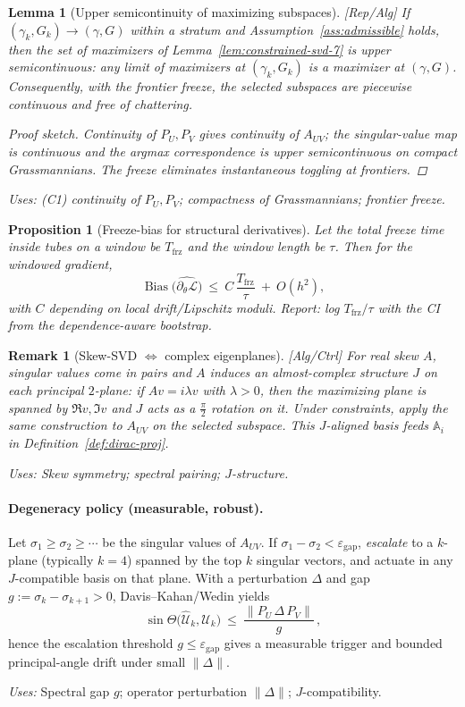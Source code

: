 \documentclass[10pt]{article}
\newcommand{\uses}[1]{\par\smallskip\noindent\textit{Uses: }#1\par\smallskip}
\newenvironment{proofsketch}{\begin{proof}[Proof sketch]}{\end{proof}}
\newtheorem{lemma}{Lemma}
\newtheorem{proposition}{Proposition}
\newtheorem{remark}{Remark}
\begin{document}
\begin{lemma}[Upper semicontinuity of maximizing subspaces]\label{lem:usc-planes}
\emph{[\textup{Rep/Alg}]}
If $(\gamma_k,G_k)\to(\gamma,G)$ within a stratum and Assumption~\ref{ass:admissible} holds, then the set of maximizers of Lemma~\ref{lem:constrained-svd-7} is \emph{upper semicontinuous}: any limit of maximizers at $(\gamma_k,G_k)$ is a maximizer at $(\gamma,G)$. 
Consequently, with the frontier freeze, the selected subspaces are piecewise continuous and free of chattering.
\begin{proofsketch}
Continuity of $P_U,P_V$ gives continuity of $A_{UV}$; the singular-value map is continuous and the argmax correspondence is upper semicontinuous on compact Grassmannians. The freeze eliminates instantaneous toggling at frontiers.
\end{proofsketch}
\uses{(C1) continuity of $P_U,P_V$; compactness of Grassmannians; frontier freeze.}
\end{lemma}

\begin{proposition}[Freeze-bias for structural derivatives]\label{prop:freeze-bias}
Let the total freeze time inside tubes on a window be $T_{\mathrm{frz}}$ and the window length be $\tau$. 
Then for the windowed gradient,
\[
\operatorname{Bias}\big(\widehat{\partial_\theta \mathcal L}\big)\ \le\ C\,\frac{T_{\mathrm{frz}}}{\tau}\ +\ O(h^2),
\]
with $C$ depending on local drift/Lipschitz moduli. \emph{Report:} log $T_{\mathrm{frz}}/\tau$ with the CI from the dependence-aware bootstrap.
\end{proposition}

\begin{remark}[Skew-SVD $\Leftrightarrow$ complex eigenplanes]\label{rem:skew-J-7}
\emph{[\textup{Alg/Ctrl}]}
For real skew $A$, singular values come in pairs and $A$ induces an almost-complex structure $J$ on each principal \(2\)-plane: if $Av=i\lambda v$ with $\lambda>0$, then the maximizing plane is spanned by $\Re v,\Im v$ and $J$ acts as a $\tfrac\pi2$ rotation on it. Under constraints, apply the same construction to $A_{UV}$ on the selected subspace. This $J$-aligned basis feeds $\mathbb A_i$ in Definition~\ref{def:dirac-proj}.
\uses{Skew symmetry; spectral pairing; $J$-structure.}
\end{remark}

\paragraph{Degeneracy policy (measurable, robust).}
Let $\sigma_1\ge\sigma_2\ge\cdots$ be the singular values of $A_{UV}$. 
If $\sigma_1-\sigma_2<\varepsilon_{\mathrm{gap}}$, \emph{escalate} to a $k$-plane (typically $k=4$) spanned by the top $k$ singular vectors, and actuate in any $J$-compatible basis on that plane. 
With a perturbation $\Delta$ and gap $g:=\sigma_k-\sigma_{k+1}>0$, Davis–Kahan/Wedin yields
\[
\sin\Theta\big(\widehat{\mathcal U}_k,\mathcal U_k\big)\ \le\ \frac{\|P_U\,\Delta\,P_V\|}{g}\,,
\]
hence the escalation threshold $g\le\varepsilon_{\mathrm{gap}}$ gives a measurable trigger and bounded principal-angle drift under small $\|\Delta\|$.
\uses{Spectral gap $g$; operator perturbation $\|\Delta\|$; $J$-compatibility.}
\end{document}
